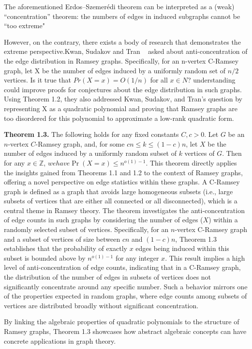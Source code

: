 The aforementioned Erdos–Szemerédi theorem can be
interpreted as a (weak) “concentration” theorem:
the numbers of edges in induced subgraphs cannot
be “too extreme"

However, on the contrary, there exists 
a body of research that demonstrates 
the extreme perspective.Kwan, Sudakov and Tran
~\cite{kwan2019anticoncentration}
asked about anti-concentration of the
edge distribution in Ramsey graphs.
Specifically, for an n-vertex C-Ramsey graph,
let X be the number of edges induced by a uniformly 
random set of $n/2$ vertices. Is it true that
$Pr(X=x)=O(1/n)$ for all $x \in N$?
understanding could improve proofs for 
conjectures about the edge distribution in such graphs.
Using Theorem 1.2, they also addressed 
Kwan, Sudakov, and Tran's question by representing X
as a quadratic polynomial and proving that 
Ramsey graphs are too disordered for this 
polynomial to approximate a low-rank quadratic form.


\textbf{Theorem 1.3.} The following holds for any fixed constants
$C, c > 0$. Let $G$ be an $n$-vertex $C$-Ramsey graph, and, 
for some $cn \leq k \leq (1 - c)n$, let $X$ be the number of edges
induced by a uniformly random subset of $k$ vertices of $G$.
Then for any $x \in \mathbb{Z}$, $we have \Pr(X = x) \leq n^{o(1)-1}$.
This theorem directly applies the insights gained from 
Theorems 1.1 and 1.2 to the context of Ramsey graphs, 
offering a novel perspective on edge statistics within these graphs.
A C-Ramsey graph is defined as a graph that avoids large homogeneous
subsets (i.e., large subsets of vertices that are either all
connected or all disconnected), which is a central theme
in Ramsey theory. The theorem investigates the anti-concentration of edge counts in such graphs by considering the number of edges ($X$) within a randomly selected subset of vertices.
Specifically, for an $n$-vertex C-Ramsey graph and a subset
of vertices of size between $cn$ and $(1-c)n$,
Theorem 1.3 establishes that the probability of exactly $x$ edges
being induced within this subset is bounded above by $n^{o(1)-1}$
for any integer $x$. This result implies a high level of 
anti-concentration of edge counts, indicating that in a C-Ramsey graph,
the distribution of the number of edges in subsets of vertices
does not significantly concentrate around any specific number.
Such a behavior mirrors one of the properties expected in random
graphs, where edge counts among subsets of vertices are distributed
broadly without significant concentration.

By linking the algebraic properties of quadratic polynomials
to the structure of Ramsey graphs, Theorem 1.3 showcases how 
abstract algebraic concepts can have concrete applications in graph theory.

